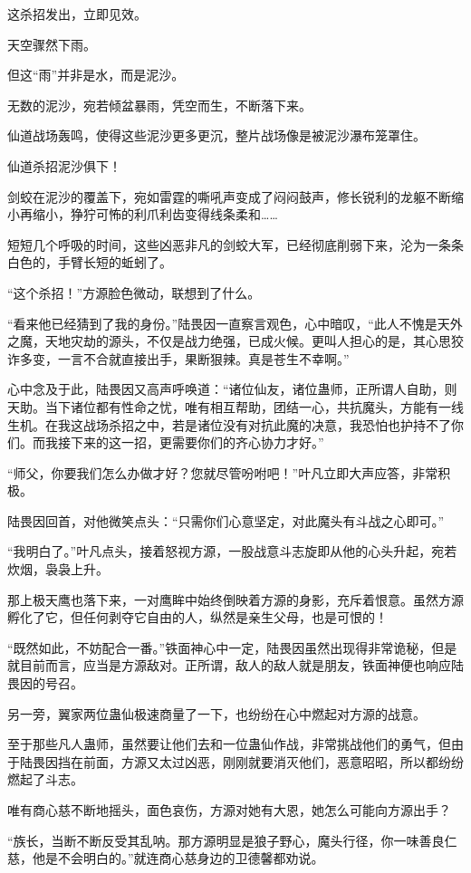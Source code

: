 \begin{this_body}
这杀招发出，立即见效。

天空骤然下雨。

但这“雨”并非是水，而是泥沙。

无数的泥沙，宛若倾盆暴雨，凭空而生，不断落下来。

仙道战场轰鸣，使得这些泥沙更多更沉，整片战场像是被泥沙瀑布笼罩住。

仙道杀招泥沙俱下！

剑蛟在泥沙的覆盖下，宛如雷霆的嘶吼声变成了闷闷鼓声，修长锐利的龙躯不断缩小再缩小，狰狞可怖的利爪利齿变得线条柔和……

短短几个呼吸的时间，这些凶恶非凡的剑蛟大军，已经彻底削弱下来，沦为一条条白色的，手臂长短的蚯蚓了。

“这个杀招！”方源脸色微动，联想到了什么。

“看来他已经猜到了我的身份。”陆畏因一直察言观色，心中暗叹，“此人不愧是天外之魔，天地灾劫的源头，不仅是战力绝强，已成火候。更叫人担心的是，其心思狡诈多变，一言不合就直接出手，果断狠辣。真是苍生不幸啊。”

心中念及于此，陆畏因又高声呼唤道：“诸位仙友，诸位蛊师，正所谓人自助，则天助。当下诸位都有性命之忧，唯有相互帮助，团结一心，共抗魔头，方能有一线生机。在我这战场杀招之中，若是诸位没有对抗此魔的决意，我恐怕也护持不了你们。而我接下来的这一招，更需要你们的齐心协力才好。”

“师父，你要我们怎么办做才好？您就尽管吩咐吧！”叶凡立即大声应答，非常积极。

陆畏因回首，对他微笑点头：“只需你们心意坚定，对此魔头有斗战之心即可。”

“我明白了。”叶凡点头，接着怒视方源，一股战意斗志旋即从他的心头升起，宛若炊烟，袅袅上升。

那上极天鹰也落下来，一对鹰眸中始终倒映着方源的身影，充斥着恨意。虽然方源孵化了它，但任何剥夺它自由的人，纵然是亲生父母，也是可恨的！

“既然如此，不妨配合一番。”铁面神心中一定，陆畏因虽然出现得非常诡秘，但是就目前而言，应当是方源敌对。正所谓，敌人的敌人就是朋友，铁面神便也响应陆畏因的号召。

另一旁，翼家两位蛊仙极速商量了一下，也纷纷在心中燃起对方源的战意。

至于那些凡人蛊师，虽然要让他们去和一位蛊仙作战，非常挑战他们的勇气，但由于陆畏因挡在前面，方源又太过凶恶，刚刚就要消灭他们，恶意昭昭，所以都纷纷燃起了斗志。

唯有商心慈不断地摇头，面色哀伤，方源对她有大恩，她怎么可能向方源出手？

“族长，当断不断反受其乱呐。那方源明显是狼子野心，魔头行径，你一味善良仁慈，他是不会明白的。”就连商心慈身边的卫德馨都劝说。


\end{this_body}

